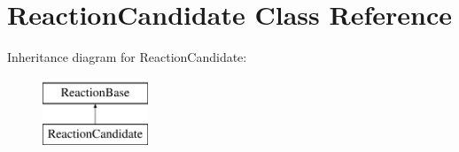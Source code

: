 \hypertarget{classReactionCandidate}{}\section{Reaction\+Candidate Class Reference}
\label{classReactionCandidate}
Inheritance diagram for Reaction\+Candidate\+:\begin{figure}[H]
\begin{center}
\leavevmode
\includegraphics[height=2.000000cm]{classReactionCandidate}
\end{center}
\end{figure}
